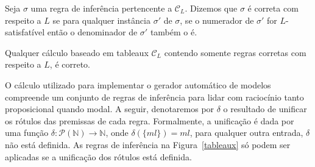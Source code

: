 \begin{definition}
    Seja $\sigma$ uma regra de inferência pertencente a $\mathcal{C}_L$. Dizemos
    que $\sigma$ é correta com respeito a $L$ se para qualquer instância $\sigma
    '$ de $\sigma$, se o numerador de $\sigma '$ for $L$-satisfatível então o
    denominador de $\sigma '$ também o é.
\end{definition}

Qualquer cálculo baseado em tableaux $\mathcal{C}_L$ contendo somente regras corretas com respeito a $L$, é
correto. 

O cálculo utilizado para implementar o gerador automático de modelos compreende
um conjunto de regras de inferência para lidar com raciocínio tanto
proposicional quando modal. A seguir, denotaremos por $\delta$ o
resultado de unificar os rótulos das premissas de cada regra. Formalmente,
a unificação é dada por uma função $\delta: \mathscr{P}(\mathbb{N})
\longrightarrow \mathbb{N}$, onde $\delta(\{ml\}) = ml$, para qualquer outra
entrada, $\delta$ não está definida. As regras de inferência na
Figura~\ref{tableaux} só podem ser aplicadas se a unificação dos rótulos está
definida\cite{DBLP:conf/tableaux/NalonHD15}.

